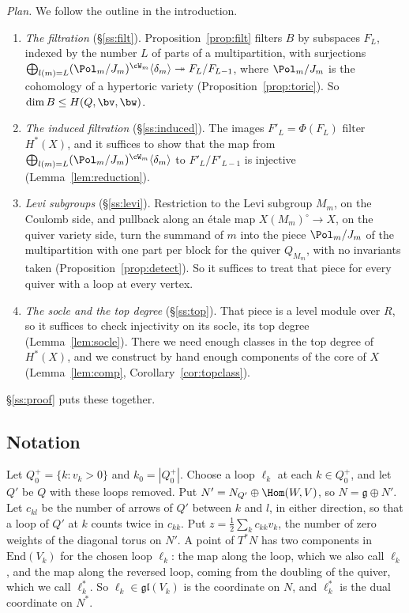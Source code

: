 \documentclass[11pt]{amsart}
\begin{document}
\emph{Plan.}  We follow the outline in the introduction.
\begin{enumerate}[leftmargin=2em,label=(\alph*)]
\item \emph{The filtration} (\S\ref{ss:filt}).  Proposition~\ref{prop:filt}
filters $B$ by subspaces $F_L$, indexed by the number $L$ of parts of a
multipartition, with surjections
$\bigoplus_{l(m)=L}(\Pol_m/J_m)^{\cW_m}\langle\delta_m\rangle\twoheadrightarrow
F_L/F_{L-1}$, where $\Pol_m/J_m$ is the cohomology of a hypertoric variety
(Proposition~\ref{prop:toric}).  So $\dim B\le H(Q,\bv,\bw)$.
\item \emph{The induced filtration} (\S\ref{ss:induced}).  The images
$F'_L=\Phi(F_L)$ filter $H^*(X)$, and it suffices to show that the map from
$\bigoplus_{l(m)=L}(\Pol_m/J_m)^{\cW_m}\langle\delta_m\rangle$ to
$F'_L/F'_{L-1}$ is injective (Lemma~\ref{lem:reduction}).
\item \emph{Levi subgroups} (\S\ref{ss:levi}).  Restriction to the Levi
subgroup $M_m$, on the Coulomb side, and pullback along an \'etale map
$X(M_m)^\circ\to X$, on the quiver variety side, turn the summand of $m$ into
the piece $\Pol_m/J_m$ of the multipartition with one part per block for the
quiver $Q_{M_m}$, with no invariants taken (Proposition~\ref{prop:detect}).
So it suffices to treat that piece for every quiver with a loop at every
vertex.
\item \emph{The socle and the top degree} (\S\ref{ss:top}).  That piece is a
level module over $R$, so it suffices to check injectivity on its socle, its
top degree (Lemma~\ref{lem:socle}).  There we need enough classes in the top
degree of $H^*(X)$, and we construct by hand enough components of the core of
$X$ (Lemma~\ref{lem:comp}, Corollary~\ref{cor:topclass}).
\end{enumerate}
\S\ref{ss:proof} puts these together.

\subsection{Notation}\label{ss:notation}
Let $Q_0^+=\{k:v_k>0\}$ and $k_0=|Q_0^+|$.  Choose a loop $\ell_k$ at each
$k\in Q_0^+$, and let $Q'$ be $Q$ with these loops removed.  Put
$N'=N_{Q'}\oplus\Hom(W,V)$, so $N=\mathfrak g\oplus N'$.  Let $c_{kl}$ be the
number of arrows of $Q'$ between $k$ and $l$, in either direction, so that a
loop of $Q'$ at $k$ counts twice in $c_{kk}$.  Put
$z=\frac12\sum_kc_{kk}v_k$, the number of zero weights of the diagonal
torus on $N'$.  A point of $T^*N$ has two components in $\mathrm{End}(V_k)$
for the chosen loop $\ell_k$: the map along the loop, which we also call
$\ell_k$, and the map along the reversed loop, coming from the doubling of
the quiver, which we call $\ell_k^*$.  So $\ell_k\in\mathfrak{gl}(V_k)$ is the
coordinate on $N$, and $\ell_k^*$ is the dual coordinate on $N^*$.
\end{document}

